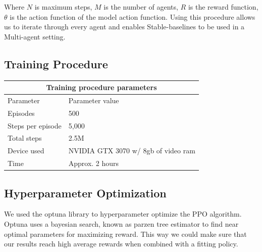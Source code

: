 \documentclass[conference]{IEEEtran}
\begin{document}
	\begin{algorithm}[!ht]
	\end{algorithm}

	Where $N$ is maximum steps, $M$ is the number of agents, $R$ is the reward function, $\theta$ is the action function of the model action function.
	Using this procedure allows us to iterate through every agent and enables Stable-baselines to be used in a Multi-agent setting.


	\subsection{Training Procedure}
	\begin{tabular}{ |p{}||p{}|  }
		\hline
		\multicolumn{2}{|c|}{Training procedure parameters} \\
		\hline
		\hline
		Parameter         & Parameter value\\
		\hline
		Episodes          & 500\\
		\hline
		Steps per episode & 5,000\\
		\hline
		Total steps       & 2.5M\\
		\hline
		\hline
		Device used       & NVIDIA GTX 3070 w/ 8gb of video ram\\
		\hline
		Time              & Approx. 2 hours\\
		\hline
	\end{tabular}


	\subsection{Hyperparameter Optimization}
	We used the optuna library to hyperparameter optimize the PPO algorithm. Optuna uses a bayesian
	search, known as parzen tree estimator to find near optimal parameters for maximizing reward. This way we could make sure that our results reach high
	average rewards when combined with a fitting policy.
\end{document}
